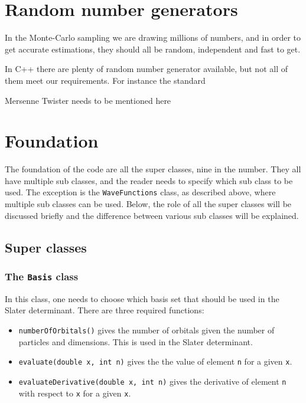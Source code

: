 \section{Random number generators} \label{sec:RNG}
In the Monte-Carlo sampling we are drawing millions of numbers, and in order to get accurate estimations, they should all be random, independent and fast to get. 

In C++ there are plenty of random number generator available, but not all of them meet our requirements. For instance the standard 

Mersenne Twister needs to be mentioned here

\section{Foundation} \label{subsec:foundation}
The foundation of the code are all the super classes, nine in the number. They all have multiple sub classes, and the reader needs to specify which sub class to be used. The exception is the \texttt{WaveFunctions} class, as described above, where multiple sub classes can be used. Below, the role of all the super classes will be discussed briefly and the difference between various sub classes will be explained. 

\subsection{Super classes}

\subsubsection{The \texttt{Basis} class}
In this class, one needs to choose which basis set that should be used in the Slater determinant. There are three required functions:
\begin{itemize}
	\item \texttt{numberOfOrbitals()} gives the number of orbitals given the number of particles and dimensions. This is used in the Slater determinant.
	
	\item \texttt{evaluate(double x, int n)} gives the the value of element \texttt{n} for a given \texttt{x}. 
	
	\item \texttt{evaluateDerivative(double x, int n)} gives the derivative of element \texttt{n} with respect to \texttt{x} for a given \texttt{x}.  
\end{itemize}

